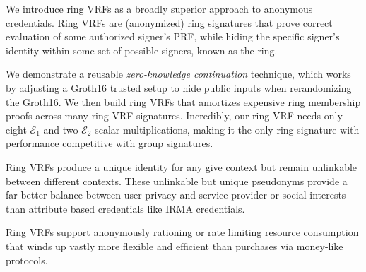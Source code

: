 
\def\eprintsmallskip{\smallskip}{}%
We introduce ring VRFs as a broadly superior approach to anonymous credentials.
Ring VRFs are (anonymized) ring signatures that prove correct evaluation
of some authorized signer's PRF, while hiding the specific signer's
identity within some set of possible signers, known as the ring.

\eprintsmallskip
We demonstrate a reusable {\em zero-knowledge continuation} technique,
which works by adjusting a Groth16 trusted setup to hide public inputs
when rerandomizing the Groth16.  We then build ring VRFs that amortizes
expensive ring membership proofs across many ring VRF signatures.
%
Incredibly, our ring VRF needs only eight $\mathcal{E}_1$ and two
$\mathcal{E}_2$ scalar multiplications, making it the only ring signature
with performance competitive with group signatures.

\eprintsmallskip
Ring VRFs produce a unique identity for any give context but remain
unlinkable between different contexts.  These unlinkable but unique
pseudonyms provide a far better balance between user privacy and service
provider or social interests than attribute based credentials like IRMA credentials.

\eprintsmallskip
Ring VRFs support anonymously rationing or rate limiting resource
consumption that winds up vastly more flexible and efficient than
purchases via money-like protocols.
